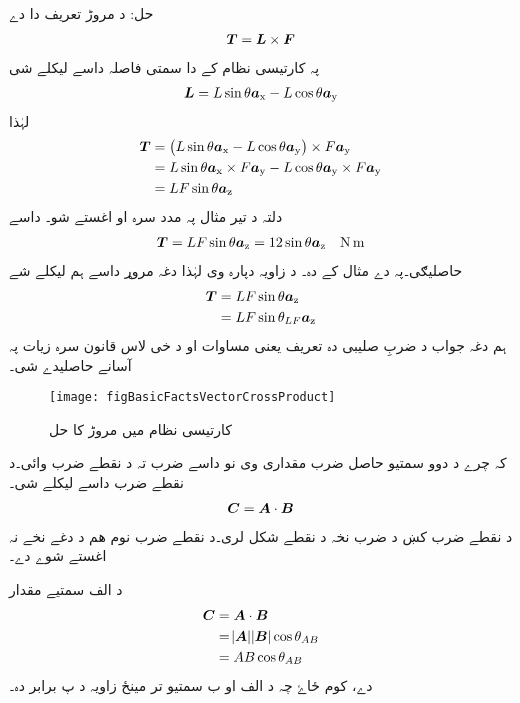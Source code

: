 	حل:
د مروڑ  تعریف دا دے
\begin{align}
{\ensuremath{{\boldsymbol{T}}}}={{\boldsymbol{L}}} \times {\ensuremath{{\boldsymbol{F}}}}
\end{align}
پہ کارتیسی نظام کے دا سمتی فاصلہ داسے لیکلے شی
\begin{align}
{\ensuremath{{\boldsymbol{L}}}}=L \sin \theta {\boldsymbol{a}}_{\textup{x}}-L \cos \theta {\boldsymbol{a}}_{\textup{y}}
\end{align}
لہٰذا
\begin{align*}
{\ensuremath{{\boldsymbol{T}}}}&=\left(L \sin \theta {\boldsymbol{a}}_{\textup{x}}-L \cos \theta {\boldsymbol{a}}_{\textup{y}} \right) \times F {\boldsymbol{a}}_{\textup{y}}\\
&=L \sin \theta {\boldsymbol{a}}_{\textup{x}} \times F {\boldsymbol{a}}_{\textup{y}}-L \cos \theta {\boldsymbol{a}}_{\textup{y}} \times F {\boldsymbol{a}}_{\textup{y}}\\
&= L F \sin \theta {\boldsymbol{a}}_{\textup{z}}
\end{align*} 
دلتہ د تیر مثال پہ مدد سرہ  او  اغستے شو۔ داسے
\begin{align*}
{\ensuremath{{\boldsymbol{T}}}}= L F \sin \theta {\boldsymbol{a}}_{\textup{z}}=12 \sin \theta {\boldsymbol{a}}_{\textup{z}} \quad \si{\newton \meter}
\end{align*}
حاصلیګی۔پہ دے مثال کے  دہ۔ د  زاویہ    دپارہ  وی لہٰذا دغہ مروړ داسے ہم لیکلے شے
\begin{align*}
{\ensuremath{{\boldsymbol{T}}}}&=LF\sin \theta {\boldsymbol{a}}_{\textup{z}}\\
&=L F \sin \theta_{LF}{\boldsymbol{a}}_{\textup{z}}
\end{align*}
ہم دغہ جواب د ضربِ صلیبی دہ تعریف یعنی مساوات  او د خی لاس قانون سرہ زیات پہ آسانے حاصلیدے شی۔
\begin{figure}
\centering
\texttt{[image: figBasicFactsVectorCrossProduct]}
\caption{کارتیسی نظام میں مروڑ کا حل}
\label{شکل_حقائق_کارتیسی_مروڑ_کا_حل}
\end{figure}
%
کہ چرے د دوو سمتیو حاصل ضرب مقداری وی نو داسے ضرب تہ د نقطے ضرب وائی۔د نقطے ضرب داسے لیکلے شی۔
\begin{align}
{\ensuremath{{\boldsymbol{C}}}}={{\boldsymbol{A}}} \cdot {\ensuremath{{\boldsymbol{B}}}}
\end{align}
د نقطے ضرب کښ د ضرب نخہ د نقطے شکل لری۔د نقطے ضرب نوم ھم د دغے نخے نہ اغستے شوے دے۔

د الف سمتیے مقدار
\begin{gather}
\begin{aligned}\label{مساوات_بنیادی_ضرب_نقطہ_تعریف}
{\ensuremath{{\boldsymbol{C}}}}&={{\boldsymbol{A}}} \cdot {\ensuremath{{\boldsymbol{B}}}}\\
&=\abs{{{\boldsymbol{A}}}} \abs{{{\boldsymbol{B}}}} \cos \theta_{AB}\\
&=A B \cos \theta_{AB}
\end{aligned}
\end{gather}
دے، کوم ځاۓ چہ د الف او ب سمتیو تر مینځ زاویہ د پ برابر دہ۔

